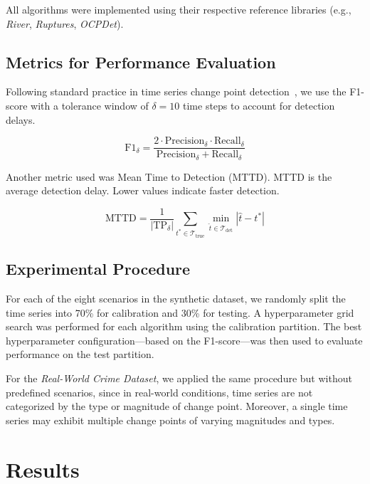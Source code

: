 \documentclass[journal,article,submit,pdftex,moreauthors]{Definitions/mdpi}
\begin{document}
All algorithms were implemented using their respective reference libraries (e.g., \textit{River}, \textit{Ruptures}, \textit{OCPDet}).

\subsection{Metrics for Performance Evaluation}
Following standard practice in time series change point detection~\cite{ref_mtd}, we use the F1-score with a tolerance window of $\delta = 10$ time steps to account for detection delays.  

\begin{equation}
\text{F1}_\delta = \frac{2 \cdot \text{Precision}_\delta \cdot \text{Recall}_\delta}{\text{Precision}_\delta + \text{Recall}_\delta}
\end{equation}

Another metric used was Mean Time to Detection (MTTD). MTTD is the average detection delay. Lower values indicate faster detection. 

\begin{equation}
\text{MTTD} = \frac{1}{|\text{TP}_\delta|} \sum_{t^* \in \mathcal{T}_{\text{true}}} \min_{\hat{t} \in \mathcal{T}_{\text{det}}} |\hat{t} - t^*|
\end{equation}


\subsection{Experimental Procedure}
For each of the eight scenarios in the synthetic dataset, we randomly split the time series into 70\% for calibration and 30\% for testing.  
A hyperparameter grid search was performed for each algorithm using the calibration partition. The best hyperparameter configuration---based on the F1-score---was then used to evaluate performance on the test partition.  

For the \textit{Real-World Crime Dataset}, we applied the same procedure but without predefined scenarios, since in real-world conditions, time series are not categorized by the type or magnitude of change point. Moreover, a single time series may exhibit multiple change points of varying magnitudes and types.



\section{Results}
\label{sec:results}
\end{document}
